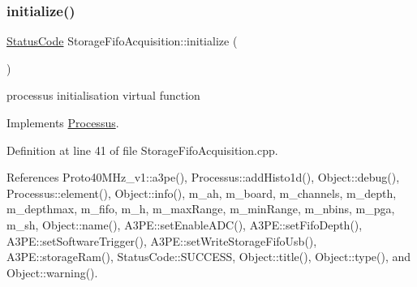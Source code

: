 \subsubsection{\texorpdfstring{initialize()}{initialize()}}
{\footnotesize\ttfamily \hyperlink{classStatusCode}{Status\+Code} Storage\+Fifo\+Acquisition\+::initialize (\begin{DoxyParamCaption}{ }\end{DoxyParamCaption})\hspace{0.3cm}{\ttfamily [virtual]}}

processus initialisation virtual function 

Implements \hyperlink{classProcessus_aee88ad7b77ae7319cf8b128e9dd2ea11}{Processus}.



Definition at line 41 of file Storage\+Fifo\+Acquisition.\+cpp.



References Proto40\+M\+Hz\+\_\+v1\+::a3pe(), Processus\+::add\+Histo1d(), Object\+::debug(), Processus\+::element(), Object\+::info(), m\+\_\+ah, m\+\_\+board, m\+\_\+channels, m\+\_\+depth, m\+\_\+depthmax, m\+\_\+fifo, m\+\_\+h, m\+\_\+max\+Range, m\+\_\+min\+Range, m\+\_\+nbins, m\+\_\+pga, m\+\_\+sh, Object\+::name(), A3\+P\+E\+::set\+Enable\+A\+D\+C(), A3\+P\+E\+::set\+Fifo\+Depth(), A3\+P\+E\+::set\+Software\+Trigger(), A3\+P\+E\+::set\+Write\+Storage\+Fifo\+Usb(), A3\+P\+E\+::storage\+Ram(), Status\+Code\+::\+S\+U\+C\+C\+E\+SS, Object\+::title(), Object\+::type(), and Object\+::warning().


